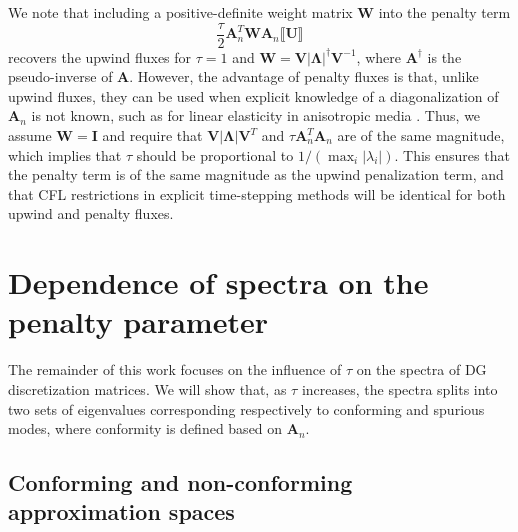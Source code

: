 \documentclass[preprint,10pt]{elsarticle}
\newcommand{\LRp}[1]{\left( #1 \right)}
\newcommand{\LRb}[1]{\left| #1 \right|}
\newcommand{\jump}[1] {\ensuremath{\llbracket#1\rrbracket}}
\begin{document}
We note that including a positive-definite weight matrix $\bm{W}$ into the penalty term
\[
\frac{\tau}{2} \bm{A}_n^T \bm{W}\bm{A}_n\jump{\bm{U}}
\]
recovers the upwind fluxes for $\tau = 1$ and $\bm{W} = \bm{V}\LRb{\bm{\Lambda}}^{\dagger}\bm{V}^{-1}$, where $\bm{A}^{\dagger}$ is the pseudo-inverse of $\bm{A}$.  However, the advantage of penalty fluxes is that, unlike upwind fluxes, they can be used when explicit knowledge of a diagonalization of $\bm{A}_n$ is not known, such as for linear elasticity in anisotropic media \cite{ye2016discontinuous}.  Thus, we assume $\bm{W} = \bm{I}$ and require that $\bm{V}\LRb{\bm{\Lambda}}\bm{V}^T$ and $\tau\bm{A}_n^T\bm{A}_n$ are of the same magnitude, which implies that $\tau$ should be proportional to $1/\LRp{\max_i\LRb{\lambda_i}}$.  This ensures that the penalty term is of the same magnitude as the upwind penalization term, and that CFL restrictions in explicit time-stepping methods will be identical for both upwind and penalty fluxes.  

\section{Dependence of spectra on the penalty parameter}

The remainder of this work focuses on the influence of $\tau$ on the spectra of DG discretization matrices.  We will show that, as $\tau$ increases, the spectra splits into two sets of eigenvalues corresponding respectively to conforming and spurious modes, where conformity is defined based on $\bm{A}_n$.  

\subsection{Conforming and non-conforming approximation spaces}
\end{document}
